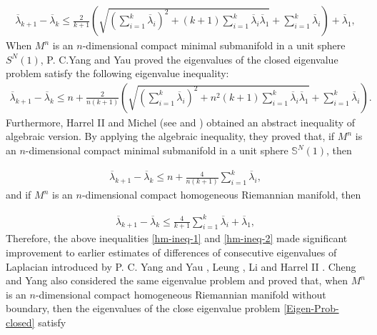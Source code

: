 \documentclass[12pt]{article}
\numberwithin{equation}{section}
\begin{document}
\begin{equation*}\begin{aligned}\overline{\lambda}_{k+1}-\overline{\lambda}_{k}\leq
\frac{2}{k+1}\left(\sqrt{\left(\sum^{k}_{i=1}\overline{\lambda}_{i}\right)^{2}+(k+1)\sum^{k}_{i=1}\overline{\lambda}_{i}\overline{\lambda}_{1}}
+\sum^{k}_{i=1}\overline{\lambda}_{i}\right)+\overline{\lambda}_{1},\end{aligned}
\end{equation*}
 When $M^{n}$ is
an $n$-dimensional compact minimal submanifold in a unit sphere $S^{N}(1)$,  P. C.Yang and Yau \cite{YY} proved the eigenvalues of the closed eigenvalue problem satisfy the following eigenvalue inequality:
\begin{equation*}\begin{aligned}\overline{\lambda}_{k+1}-\overline{\lambda}_{k}\leq n+
\frac{2}{n(k+1)}\left(\sqrt{\left(\sum^{k}_{i=1}\overline{\lambda}_{i}\right)^{2}+n^{2}(k+1)
\sum^{k}_{i=1}\overline{\lambda}_{i}\overline{\lambda}_{1}}+\sum^{k}_{i=1}\overline{\lambda}_{i}\right).\end{aligned}\end{equation*} Furthermore, Harrel II and Michel (see \cite{HM} and \cite{H3}) obtained an abstract inequality of algebraic version. By applying the algebraic inequality, they proved that,
if $M^{n}$ is an $n$-dimensional compact minimal submanifold in a unit
sphere $\mathbb{S}^{N}(1)$, then

\begin{equation}\begin{aligned}\label{hm-ineq-1}\overline{\lambda}_{k+1}-\overline{\lambda}_{k}\leq n+
\frac{4}{n(k+1)}\sum^{k}_{i=1}\overline{\lambda}_{i},\end{aligned}
\end{equation}
and if $M^{n}$ is an $n$-dimensional compact homogeneous Riemannian manifold, then

\begin{equation}\begin{aligned}\label{hm-ineq-2}\overline{\lambda}_{k+1}-\overline{\lambda}_{k}\leq
\frac{4}{k+1}\sum^{k}_{i=1}\overline{\lambda}_{i}+\overline{\lambda}_{1},\end{aligned}
\end{equation} Therefore, the above inequalities \eqref{hm-ineq-1} and \eqref{hm-ineq-2} made significant improvement to earlier
estimates of differences of consecutive eigenvalues of Laplacian introduced by
P. C. Yang and Yau  \cite{YY}, Leung  \cite{Le}, Li \cite{L} and Harrel II \cite{HM}.
Cheng and Yang \cite{CY1} also considered the same eigenvalue problem and proved that, when $M^{n}$
is an $n$-dimensional compact homogeneous Riemannian manifold  without  boundary, then the eigenvalues of the
close eigenvalue problem \eqref{Eigen-Prob-closed} satisfy
\end{document}
